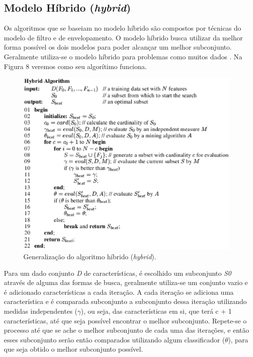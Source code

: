 \subsection{Modelo Híbrido (\textit{hybrid})}

Os algoritmos que se baseiam no modelo híbrido são compostos por técnicas do modelo de filtro e de envelopamento. O modelo híbrido busca utilizar da melhor forma possível os dois modelos para poder alcançar um melhor subconjunto. Geralmente utiliza-se o modelo híbrido para problemas como muitos dados \cite{liu_2005}. Na Figura 8 veremos como seu algorítimo funciona.

\begin{figure}[h]
	\centering
	\label{fig09}
		\includegraphics[keepaspectratio=true,scale=0.7]{figuras/fig09.eps}
	\caption{Generalização do algoritmo híbrido (\textit{hybrid}). \cite{liu_2005}}
\end{figure}

Para um dado conjunto \textit{D} de características, é escolhido um subconjunto \textit{S0} através de alguma das formas de busca, geralmente utiliza-se um conjunto vazio e é adicionado características a cada iteração. A cada iteração se adiciona uma característica e é comparada subconjunto a subconjunto dessa iteração utilizando medidas independentes ($\gamma$), ou seja, das características em si, que terá c + 1 características, até que seja possível encontrar o melhor subconjunto. Repete-se o processo até que se ache o melhor subconjunto de cada uma das iterações, e então esses subconjunto serão então comparados utilizando algum classificador ($\theta$), para que seja obtido o melhor subconjunto possível. \cite{liu_2005}

